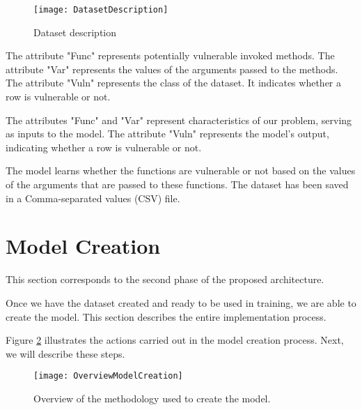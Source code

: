 \begin{figure}[ht]
	\centering
	\texttt{[image: DatasetDescription]}
	  \caption{Dataset description}
  \label{fig:DattDesc}
\end{figure}

The attribute "Func" represents potentially vulnerable invoked methods.
The attribute "Var" represents the values of the arguments passed to the methods.
The attribute "Vuln" represents the class of the dataset. It indicates whether a row is vulnerable or not.

The attributes "Func" and "Var" represent characteristics of our problem, serving as inputs to the model. The attribute "Vuln" represents the model's output, indicating whether a row is vulnerable or not.

The model learns whether the functions are vulnerable or not based on the values of the arguments that are passed to these functions. The dataset has been saved in a Comma-separated values (CSV) file.



\section{Model Creation} %
\label{sec:	Model_Creation}

This section corresponds to the second phase of the proposed architecture.

Once we have the dataset created and ready to be used in training, we are able to create the model. This section describes the entire implementation process.

Figure \ref{fig:model_creation_methodology} illustrates the actions carried out in the model creation process. Next, we will describe these steps.

\begin{figure}[ht]	
	\centering
	\texttt{[image: OverviewModelCreation]}
	  \caption{Overview of the methodology used to create the model.}
  \label{fig:model_creation_methodology}
\end{figure}

